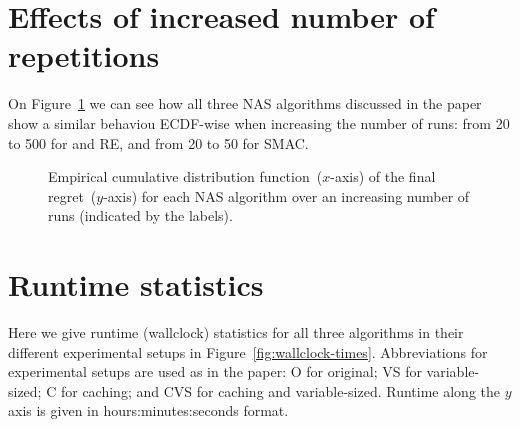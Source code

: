 \section{Effects of increased number of repetitions}
On Figure~\ref{fig:repetitions-ecdfs} we can see how all three NAS algorithms discussed in the paper show a similar behaviou ECDF-wise when increasing the number of runs: from 20 to 500 for \irace and RE, and from 20 to 50 for SMAC.

\begin{figure}
\centerline{%
\hfil
{}
\hfil
{}
}
\caption{Empirical cumulative distribution function~($x$-axis) of the final regret~($y$-axis) for each NAS algorithm over an increasing number of runs (indicated by the labels).}
\label{fig:repetitions-ecdfs}
\end{figure}

\section{Runtime statistics}
Here we give runtime (wallclock) statistics for all three algorithms in their different experimental setups in Figure~\ref{fig:wallclock-times}. Abbreviations for experimental setups are used as in the paper: O for original; VS for variable-sized; C for caching; and CVS for caching and variable-sized. Runtime along the $y$ axis is given in hours:minutes:seconds format.

